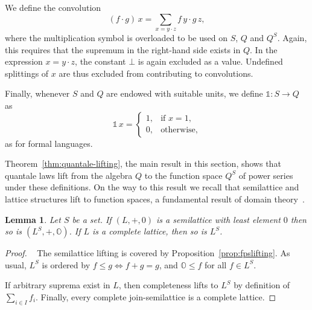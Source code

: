 \documentclass[12pt]{article}
\newtheorem{lemma}{Lemma}
\theoremstyle{definition}
\newcommand{\unit}{\mathbb{1}}
\newcommand{\zero}{\mathbb{O}}
\begin{document}
We define the convolution
\begin{equation*}
  (f\cdot g)\, x = \sum_{x=y\cdot z} f\, y\cdot g\, z,
\end{equation*}
where the multiplication symbol is overloaded to be used on $S$, $Q$
and $Q^S$. Again, this requires that the supremum in the right-hand
side exists in $Q$.  In the expression $x=y\cdot z$, the constant
$\bot$ is again excluded as a value. Undefined splittings of $x$ are
thus excluded from contributing to convolutions.

Finally, whenever $S$ and $Q$ are endowed with suitable units, we
define $\unit : S\to Q$ as
\begin{equation*}
  \unit\, x = 
  \begin{cases}
    1, & \text{if } x = 1,\\
    0, & \text{otherwise},
  \end{cases}
\end{equation*}
as for formal languages. 


Theorem~\ref{thm:quantale-lifting}, the main result in this section,
shows that quantale laws lift from the algebra $Q$ to the function
space $Q^S$ of power series under these definitions. On the way to
this result we recall that semilattice and lattice structures lift to
function spaces, a fundamental result of domain
theory~\cite{AbramskyJung}.

\begin{lemma}\label{lem:semilattice-lifting}
  Let $S$ be a set. If $(L,+,0)$ is a semilattice with least element
  $0$ then so is $(L^S,+,\zero)$. If $L$ is a complete lattice, then so is
  $L^S$.
\end{lemma}
\begin{proof}~ The semilattice lifting is covered by
  Proposition~\ref{prop:fpslifting}. As usual, $L^S$ is ordered by
  $f\le g\Leftrightarrow f+g=g$, and $\zero \le f$ for all $f\in L^S$.

  If arbitrary suprema exist in $L$, then completeness lifts to
  $L^S$ by definition of $\sum_{i\in I}f_i$.  Finally, every complete
  join-semilattice is a complete lattice.
\end{proof}
\end{document}
